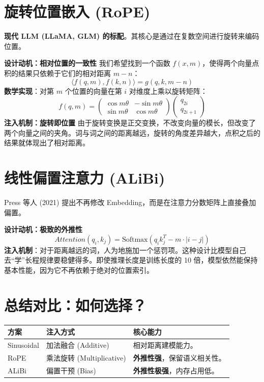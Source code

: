 \documentclass[12pt, a4paper]{article}
\begin{document}
\section{旋转位置嵌入 (RoPE)}
\textbf{现代 LLM (LLaMA, GLM) 的标配}。其核心是通过在复数空间进行旋转来编码位置。

\textbf{设计动机：相对位置的一致性}
我们希望找到一个函数 $f(x, m)$，使得两个向量点积的结果只依赖于它们的相对距离 $m-n$：
$$ \langle f(q, m), f(k, n) \rangle = g(q, k, m-n) $$
\textbf{数学实现}：对第 $m$ 个位置的向量在第 $i$ 对维度上乘以旋转矩阵：
$$ f(q, m) = \begin{pmatrix} \cos m\theta & -\sin m\theta \\ \sin m\theta & \cos m\theta \end{pmatrix} \begin{pmatrix} q_{2i} \\ q_{2i+1} \end{pmatrix} $$
\textbf{注入机制：旋转即位置}
由于旋转变换是正交变换，不改变向量的模长，但改变了两个向量之间的夹角。词与词之间的距离越远，旋转的角度差异越大，点积之后的结果就体现出了相对距离。

\section{线性偏置注意力 (ALiBi)}
Press 等人 (2021) 提出不再修改 Embedding，而是在注意力分数矩阵上直接叠加偏置。

\textbf{设计动机：极致的外推性}
$$ Attention(q_i, k_j) = \text{Softmax}(q_i k_j^T - m \cdot |i - j|) $$
\textbf{注入机制}：对于距离越远的词，人为地施加一个惩罚项。这种设计比模型自己去“学”长程规律要稳健得多。即使推理长度是训练长度的 10 倍，模型依然能保持基本性能，因为它不再依赖于绝对的位置索引。

\section{总结对比：如何选择？}
\begin{table}[h!]
\centering
\begin{tabularx}{\textwidth}{|l|X|X|}
\hline
\textbf{方案} & \textbf{注入方式} & \textbf{核心能力} \\
\hline
Sinusoidal & 加法融合 (Additive) & 相对距离建模能力。 \\
\hline
RoPE & 乘法旋转 (Multiplicative) & \textbf{外推性强}，保留语义相关性。 \\
\hline
ALiBi & 偏置干预 (Bias) & \textbf{外推性极强}，内存占用低。 \\
\hline
\end{tabularx}
\end{table}
\end{document}
